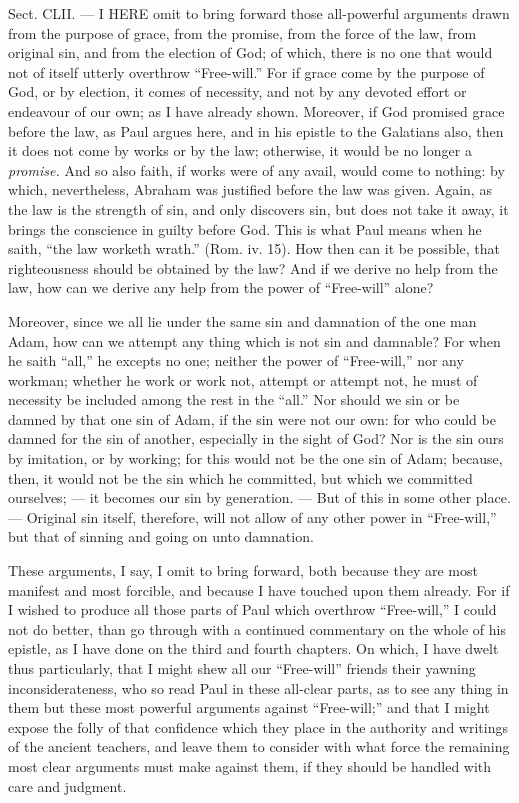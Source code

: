 
Sect. CLII. — I \textsc{HERE} omit to bring forward those all-powerful arguments drawn from the purpose of grace, from the promise, from the force of the law, from original sin, and from the election of God; of which, there is no one that would not of itself utterly overthrow “Free-will.” For if grace come by the purpose of God, or by election, it comes of necessity, and not by any devoted effort or endeavour of our own; as I have already shown. Moreover, if God promised grace before the law, as Paul argues here, and in his epistle to the Galatians also, then it does not come by works or by the law; otherwise, it would be no longer a \emph{promise. }And so also faith, if works were of any avail, would come to nothing: by which, nevertheless, Abraham was justified before the law was given. Again, as the law is the strength of sin, and only discovers sin, but does not take it away, it brings the conscience in guilty before God. This is what Paul means when he saith, “the law worketh wrath.” (Rom. iv. 15). How then can it be possible, that righteousness should be obtained by the law? And if we derive no help from the law, how can we derive any help from the power of “Free-will” alone?

Moreover, since we all lie under the same sin and damnation of the one man Adam, how can we attempt any thing which is not sin and damnable? For when he saith “all,” he excepts no one; neither the power of “Free-will,” nor any workman; whether he work or work not, attempt or attempt not, he must of necessity be included among the rest in the “all.” Nor should we sin or be damned by that one sin of Adam, if the sin were not our own: for who could be damned for the sin of another, especially in the sight of God? Nor is the sin ours by imitation, or by working; for this would not be the one sin of Adam; because, then, it would not be the sin which he committed, but which we committed ourselves; — it becomes our sin by generation. — But of this in some other place. — Original sin itself, therefore, will not allow of any other power in “Free-will,” but that of sinning and going on unto damnation.

These arguments, I say, I omit to bring forward, both because they are most manifest and most forcible, and because I have touched upon them already. For if I wished to produce all those parts of Paul which overthrow “Free-will,” I could not do better, than go through with a continued commentary on the whole of his epistle, as I have done on the third and fourth chapters. On which, I have dwelt thus particularly, that I might shew all our “Free-will” friends their yawning inconsiderateness, who so read Paul in these all-clear parts, as to see any thing in them but these most powerful arguments against “Free-will;” and that I might expose the folly of that confidence which they place in the authority and writings of the ancient teachers, and leave them to consider with what force the remaining most clear arguments must make against them, if they should be handled with care and judgment.

